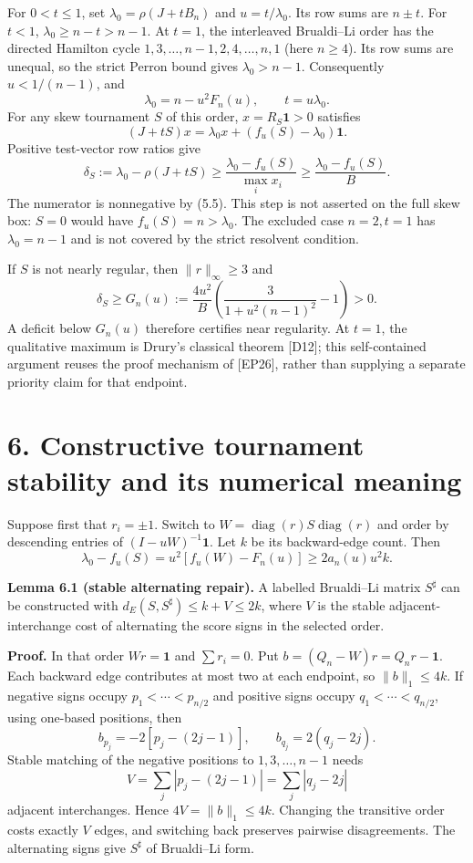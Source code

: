 \documentclass[
  11pt,
  a4paper,
]{article}
\begin{document}
For \(0<t\le1\), set \(\lambda_0=\rho(J+tB_n)\) and \(u=t/\lambda_0\).
Its row sums are \(n\pm t\). For \(t<1\), \(\lambda_0\ge n-t>n-1\). At
\(t=1\), the interleaved Brualdi--Li order has the directed Hamilton
cycle \(1,3,\ldots,n-1,2,4,\ldots,n,1\) (here \(n\ge4\)). Its row sums
are unequal, so the strict Perron bound gives \(\lambda_0>n-1\).
Consequently \(u<1/(n-1)\), and
\[\lambda_0=n-u^2F_n(u),\qquad t=u\lambda_0.                 \tag{5.6}\]
For any skew tournament \(S\) of this order, \(x=R_S\mathbf1>0\)
satisfies \[ (J+tS)x=\lambda_0x+(f_u(S)-\lambda_0)\mathbf1.\] Positive
test-vector row ratios give \[
 \delta_S:=\lambda_0-\rho(J+tS)
 \ge\frac{\lambda_0-f_u(S)}{\max_i x_i}
 \ge\frac{\lambda_0-f_u(S)}B.                               \tag{5.7}
\] The numerator is nonnegative by (5.5). This step is not asserted on
the full skew box: \(S=0\) would have \(f_u(S)=n>\lambda_0\). The
excluded case \(n=2,t=1\) has \(\lambda_0=n-1\) and is not covered by
the strict resolvent condition.

If \(S\) is not nearly regular, then \(\|r\|_\infty\ge3\) and
\[\delta_S\ge G_n(u):=\frac{4u^2}B
 \left(\frac3{1+u^2(n-1)^2}-1\right)>0.                    \tag{5.8}\] A
deficit below \(G_n(u)\) therefore certifies near regularity. At
\(t=1\), the qualitative maximum is Drury's classical theorem {[}D12{]};
this self-contained argument reuses the proof mechanism of {[}EP26{]},
rather than supplying a separate priority claim for that endpoint.

\section{6. Constructive tournament stability and its numerical
meaning}\label{constructive-tournament-stability-and-its-numerical-meaning}

Suppose first that \(r_i=\pm1\). Switch to
\(W=\operatorname{diag}(r)S\operatorname{diag}(r)\) and order by
descending entries of \((I-uW)^{-1}\mathbf1\). Let \(k\) be its
backward-edge count. Then
\[\lambda_0-f_u(S)=u^2[f_u(W)-F_n(u)]\ge2a_n(u)u^2k.        \tag{6.1}\]

\textbf{Lemma 6.1 (stable alternating repair).} A labelled Brualdi--Li
matrix \(S^\sharp\) can be constructed with
\(d_E(S,S^\sharp)\le k+V\le2k\), where \(V\) is the stable
adjacent-interchange cost of alternating the score signs in the selected
order.

\textbf{Proof.} In that order \(Wr=\mathbf1\) and \(\sum r_i=0\). Put
\(b=(Q_n-W)r=Q_nr-\mathbf1\). Each backward edge contributes at most two
at each endpoint, so \(\|b\|_1\le4k\). If negative signs occupy
\(p_1<\cdots<p_{n/2}\) and positive signs occupy \(q_1<\cdots<q_{n/2}\),
using one-based positions, then
\[b_{p_j}=-2[p_j-(2j-1)],\qquad b_{q_j}=2(q_j-2j).\] Stable matching of
the negative positions to \(1,3,\ldots,n-1\) needs
\[V=\sum_j|p_j-(2j-1)|=\sum_j|q_j-2j|\] adjacent interchanges. Hence
\(4V=\|b\|_1\le4k\). Changing the transitive order costs exactly \(V\)
edges, and switching back preserves pairwise disagreements. The
alternating signs give \(S^\sharp\) of Brualdi--Li form.
\end{document}
